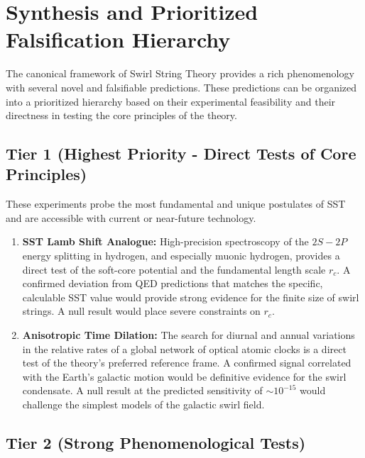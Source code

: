 \documentclass[11pt, a4paper]{article}
\begin{document}
\section{Synthesis and Prioritized Falsification Hierarchy}

    The canonical framework of Swirl String Theory provides a rich phenomenology with several novel and falsifiable predictions. These predictions can be organized into a prioritized hierarchy based on their experimental feasibility and their directness in testing the core principles of the theory.

    \subsection{Tier 1 (Highest Priority - Direct Tests of Core Principles)}

        These experiments probe the most fundamental and unique postulates of SST and are accessible with current or near-future technology.
        \begin{enumerate}
        \item \textbf{SST Lamb Shift Analogue:} High-precision spectroscopy of the $2S-2P$ energy splitting in hydrogen, and especially muonic hydrogen, provides a direct test of the soft-core potential and the fundamental length scale $r_c$. A confirmed deviation from QED predictions that matches the specific, calculable SST value would provide strong evidence for the finite size of swirl strings. A null result would place severe constraints on $r_c$.
        \item \textbf{Anisotropic Time Dilation:} The search for diurnal and annual variations in the relative rates of a global network of optical atomic clocks is a direct test of the theory's preferred reference frame. A confirmed signal correlated with the Earth's galactic motion would be definitive evidence for the swirl condensate. A null result at the predicted sensitivity of $\sim 10^{-15}$ would challenge the simplest models of the galactic swirl field.
        \end{enumerate}

    \subsection{Tier 2 (Strong Phenomenological Tests)}
\end{document}
